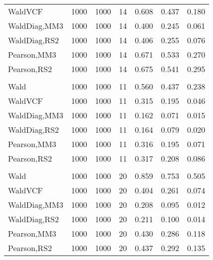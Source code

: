 \documentclass[
]{article}
\begin{document}
\begin{table}[H]
{\begin{tabular}[t]{lrrrrrr}
\hspace{1em}WaldVCF & 1000 & 1000 & 14 & 0.608 & 0.437 & 0.180\\
\hspace{1em}WaldDiag,MM3 & 1000 & 1000 & 14 & 0.400 & 0.245 & 0.061\\
\hspace{1em}WaldDiag,RS2 & 1000 & 1000 & 14 & 0.406 & 0.255 & 0.076\\
\hspace{1em}Pearson,MM3 & 1000 & 1000 & 14 & 0.671 & 0.533 & 0.270\\
\hspace{1em}Pearson,RS2 & 1000 & 1000 & 14 & 0.675 & 0.541 & 0.295\\
\addlinespace[0.3em]
\multicolumn{7}{l}{\textbf{2F 10V}}\\
\hspace{1em}Wald & 1000 & 1000 & 11 & 0.560 & 0.437 & 0.238\\
\hspace{1em}WaldVCF & 1000 & 1000 & 11 & 0.315 & 0.195 & 0.046\\
\hspace{1em}WaldDiag,MM3 & 1000 & 1000 & 11 & 0.162 & 0.071 & 0.015\\
\hspace{1em}WaldDiag,RS2 & 1000 & 1000 & 11 & 0.164 & 0.079 & 0.020\\
\hspace{1em}Pearson,MM3 & 1000 & 1000 & 11 & 0.316 & 0.195 & 0.071\\
\hspace{1em}Pearson,RS2 & 1000 & 1000 & 11 & 0.317 & 0.208 & 0.086\\
\addlinespace[0.3em]
\multicolumn{7}{l}{\textbf{3F 15V}}\\
\hspace{1em}Wald & 1000 & 1000 & 20 & 0.859 & 0.753 & 0.505\\
\hspace{1em}WaldVCF & 1000 & 1000 & 20 & 0.404 & 0.261 & 0.074\\
\hspace{1em}WaldDiag,MM3 & 1000 & 1000 & 20 & 0.208 & 0.095 & 0.012\\
\hspace{1em}WaldDiag,RS2 & 1000 & 1000 & 20 & 0.211 & 0.100 & 0.014\\
\hspace{1em}Pearson,MM3 & 1000 & 1000 & 20 & 0.430 & 0.286 & 0.118\\
\hspace{1em}Pearson,RS2 & 1000 & 1000 & 20 & 0.437 & 0.292 & 0.135\\
\bottomrule
\end{tabular}}
\endgroup{}
\end{table}
\end{document}
